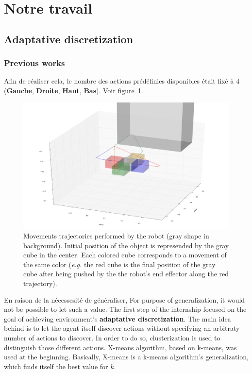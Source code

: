 \documentclass{llncs}
\begin{document}
\section{Notre travail}


\subsection{Adaptative discretization}

\subsubsection{Previous works}

Afin de réaliser cela, le nombre des actions prédéfinies disponibles était fixé à 4 (\textbf{Gauche}, \textbf{Droite}, \textbf{Haut}, \textbf{Bas}). Voir figure~\ref{fig:trajectories}.

\begin{figure}
	\centering
	\includegraphics[width=\textwidth]{figures/trajectories}
	\caption{Movements trajectories performed by the robot (gray shape in background). Initial position of the object is represended by the gray cube in the center. Each colored cube corresponds to a movement of the same color (\textit{e.g.} the red cube is the final position of the gray cube after being pushed by the the robot's end effector along the red trajectory).}
	\label{fig:trajectories}
\end{figure}

En raison de la nécessesité de généraliser,
For purpose of generalization, it would not be possible to let such a value. The first step of the internship focused on the goal of achieving environment's \textbf{adaptative discretization}. The main idea behind is to let the agent itself discover actions without specifying an arbitraty number of actions to discover.  In order to do so, clusterization is used to distinguish those different actions. X-means algorithm\cite{Pelleg:2000:XEK:645529.657808}, based on k-means, was used at the beginning. Basically, X-means is a k-means algorithm's generalization, which finds itself the best value for $k$.
\end{document}
